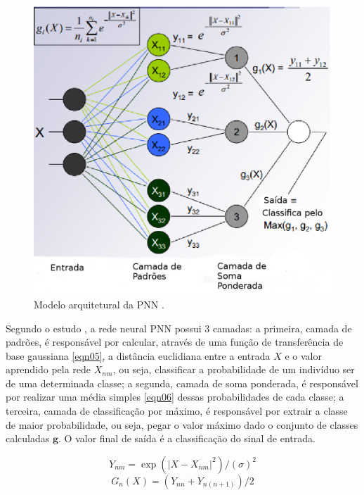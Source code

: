 \begin{figure}[t!]
	\centering
		\includegraphics[scale=0.7]{figuras/PNN.eps}
	\caption{Modelo arquitetural da PNN \cite{neuron-arq}.}
	\label{fig:pnn}
\end{figure}

\newpage
Segundo o estudo \cite{specht1990probabilistic}, a rede neural PNN possui 3 camadas: a primeira, camada de padrões, é responsável por calcular, através de uma função de transferência de base gaussiana \ref{eqn05}, a distância euclidiana entre a entrada $X$ e o valor aprendido pela rede $X_{nm}$, ou seja,  classificar a probabilidade de um indivíduo ser de uma determinada classe; a segunda, camada de soma ponderada, é responsável por realizar uma média simples \ref{eqn06} dessas probabilidades de cada classe; a terceira, camada de classificação por máximo, é responsável por extrair a classe de maior probabilidade, ou seja, pegar o valor máximo dado o conjunto de classes calculadas $\textbf{g}$. O valor final de saída é a classificação do sinal de entrada.

\begin{equation}
\label{eqn05}
	Y_{nm} = \exp{(|X - X_{nm}|^2)/(\sigma)^2}
\end{equation}
\begin{equation}
\label{eqn06}
	G_n(X) = (Y_{nn} + Y_{n(n+1)})/2
\end{equation}

